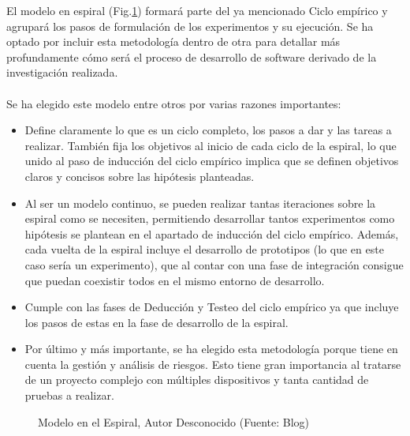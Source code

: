 El modelo en espiral (Fig.\ref{fig:MetodologiaEspiral}) formará parte del ya mencionado Ciclo empírico y agrupará los pasos de formulación de los experimentos y su ejecución. Se ha optado por incluir esta metodología dentro de otra para detallar más profundamente cómo será el proceso de desarrollo de software derivado de la investigación realizada.
\\ \\
Se ha elegido este modelo entre otros por varias razones importantes:
\begin{itemize}
    \item Define claramente lo que es un ciclo completo, los pasos a dar y las tareas a realizar. También fija los objetivos al inicio de cada ciclo de la espiral, lo que unido al paso de inducción del ciclo empírico implica que se definen objetivos claros y concisos sobre las hipótesis planteadas.
    \item Al ser un modelo continuo, se pueden realizar tantas iteraciones sobre la espiral como se necesiten, permitiendo desarrollar tantos experimentos como hipótesis se plantean en el apartado de inducción del ciclo empírico. Además, cada vuelta de la espiral incluye el desarrollo de prototipos (lo que en este caso sería un experimento), que al contar con una fase de integración consigue que puedan coexistir todos en el mismo entorno de desarrollo.
    \item Cumple con las fases de Deducción y Testeo del ciclo empírico ya que incluye los pasos de estas en la fase de desarrollo de la espiral.
    \item Por último y más importante, se ha elegido esta metodología porque tiene en cuenta la gestión y análisis de riesgos. Esto tiene gran importancia al tratarse de un proyecto complejo con múltiples dispositivos y tanta cantidad de pruebas a realizar.
\end{itemize}

\begin{figure}[thbp]
    \centering
    \caption{Modelo en el Espiral, Autor Desconocido (Fuente: Blog\autocite{CicloVidaSoftware2016})} 
    \label{fig:MetodologiaEspiral}
\end{figure}

